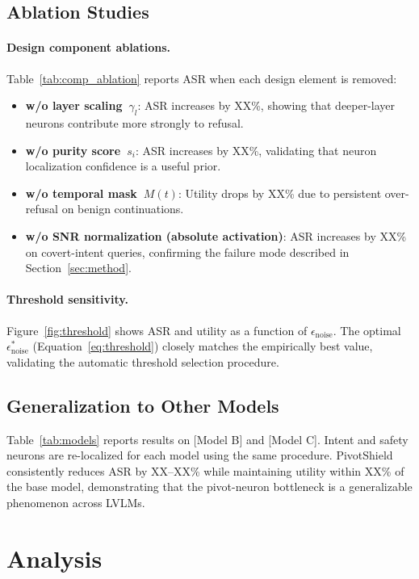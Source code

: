 \documentclass{article}
\newcommand{\method}{PivotShield\xspace}
\newcommand{\epsnoise}{\epsilon_{\mathrm{noise}}}
\begin{document}
\subsection{Ablation Studies}

\paragraph{Design component ablations.}
Table~\ref{tab:comp_ablation} reports ASR when each design
element is removed:
\begin{itemize}
  \item \textbf{w/o layer scaling~$\gamma_l$}: ASR increases by
    XX\%, showing that deeper-layer neurons contribute more
    strongly to refusal.
  \item \textbf{w/o purity score~$s_i$}: ASR increases by XX\%,
    validating that neuron localization confidence is a useful
    prior.
  \item \textbf{w/o temporal mask~$M(t)$}: Utility drops by
    XX\% due to persistent over-refusal on benign continuations.
  \item \textbf{w/o SNR normalization (absolute activation)}:
    ASR increases by XX\% on covert-intent queries, confirming
    the failure mode described in Section~\ref{sec:method}.
\end{itemize}

\paragraph{Threshold sensitivity.}
Figure~\ref{fig:threshold} shows ASR and utility as a function
of $\epsnoise$.
The optimal $\epsnoise^*$ (Equation~\ref{eq:threshold}) closely
matches the empirically best value, validating the automatic
threshold selection procedure.

\subsection{Generalization to Other Models}

Table~\ref{tab:models} reports results on [Model B] and [Model C].
Intent and safety neurons are re-localized for each model using
the same procedure.
\method consistently reduces ASR by XX--XX\% while maintaining
utility within XX\% of the base model, demonstrating that the
pivot-neuron bottleneck is a generalizable phenomenon across
LVLMs.

\section{Analysis}
\label{sec:analysis}
\end{document}
